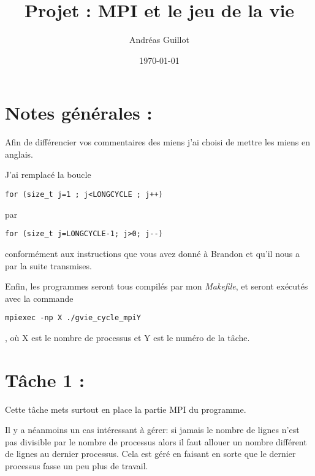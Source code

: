 \documentclass{article}
\title{Projet : MPI et le jeu de la vie}
\author{Andréas Guillot}
\date{\today}
\begin{document}
\maketitle

\section*{Notes générales :}

Afin de différencier vos commentaires des miens j'ai choisi de mettre les miens en anglais.

J'ai remplacé la boucle
\begin{verbatim}
for (size_t j=1 ; j<LONGCYCLE ; j++)
\end{verbatim} par \begin{verbatim}
for (size_t j=LONGCYCLE-1; j>0; j--)
\end{verbatim} conformément aux instructions que vous avez donné à Brandon et qu'il nous a par la suite transmises.

Enfin, les programmes seront tous compilés par mon \textit{Makefile}, et seront exécutés avec la commande \begin{verbatim}
mpiexec -np X ./gvie_cycle_mpiY
\end{verbatim}, où X est le nombre de processus et Y est le numéro de la tâche.

\section{Tâche 1 :}

Cette tâche mets surtout en place la partie MPI du programme.

\medskip

Il y a néanmoins un cas intéressant à gérer: si jamais le nombre de lignes n'est pas divisible par le nombre de processus alors il faut allouer un nombre différent de lignes au dernier processus.
Cela est géré en faisant en sorte que le dernier processus fasse un peu plus de travail.
\end{document}
